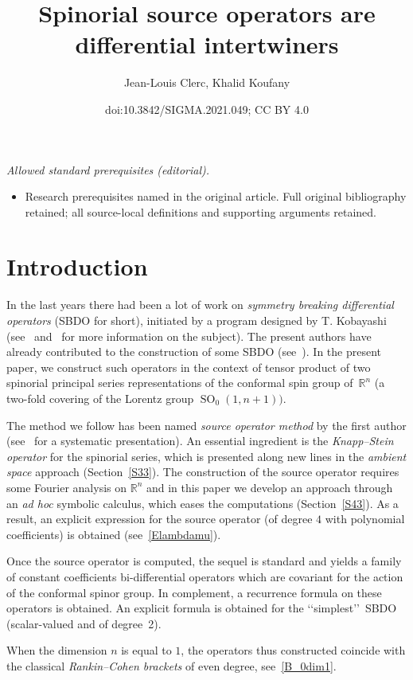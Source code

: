 \documentclass[10pt,a4paper]{amsart}
\title{Spinorial source operators are differential intertwiners}
\author{Jean-Louis Clerc, Khalid Koufany}
\date{doi:10.3842/SIGMA.2021.049; CC BY 4.0}
\DeclareMathOperator{\SO}{SO}
\numberwithin{equation}{section}
\begin{document}
\maketitle
\noindent\textit{Allowed standard prerequisites (editorial).}\begin{itemize}
\item Research prerequisites named in the original article. Full original bibliography retained; all source-local definitions and supporting arguments retained.
\end{itemize}\medskip
\section{Introduction}\vspace{-1ex}

In the last years there had been a lot of work on \emph{symmetry breaking differential operators} (SBDO for short), initiated by a program designed by T. Kobayashi (see~\cite{k} and~\cite{kp16} for more information on the subject). The present authors have already contributed to the construction of some SBDO (see~\cite{bc, bck2, bck1, c19}). In the present paper, we construct such operators in the context of tensor product of two spinorial principal series representations of the conformal spin group of~$\mathbb R^n$ (a two-fold covering of the Lorentz group $\SO_0(1, n+1))$.

The method we follow has been named \emph{source operator method} by the first author (see~\cite{c19} for a systematic presentation). An essential ingredient is the \emph{Knapp--Stein operator} for the spinorial series, which is presented along new lines in the \emph{ambient space} approach (Section~\ref{S33}). The construction of the source operator requires some Fourier analysis on $\mathbb R^n$ and in this paper we develop an approach through an \emph{ad hoc} symbolic calculus, which eases the computations (Section~\ref{S43}). As a result, an explicit expression for the source operator (of degree $4$ with polynomial coefficients) is obtained (see~\eqref{Elambdamu}).

Once the source operator is computed, the sequel is standard and yields a family of constant coefficients bi-differential operators which are covariant for the action of the conformal spinor group. In complement, a recurrence formula on these operators is obtained. An explicit formula is obtained for the \lq\lq simplest\rq\rq\ SBDO (scalar-valued and of degree~2).

When the dimension $n$ is equal to $1$, the operators thus constructed coincide with the classical
\emph{Rankin--Cohen brackets} of even degree, see~\eqref{B_0dim1}.
\end{document}
